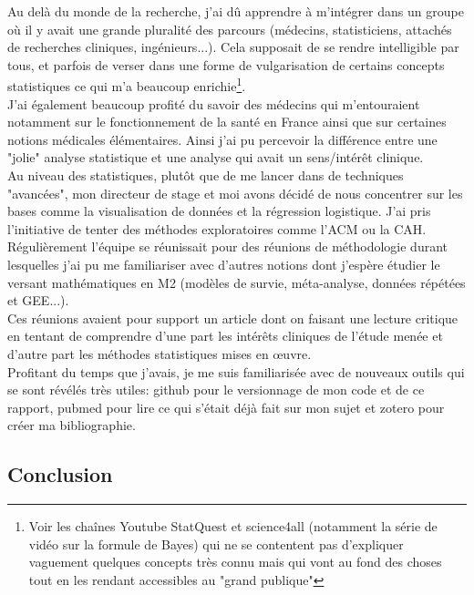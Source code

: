 \documentclass{book}
\begin{document}
\bigskip
\noindent
Au delà du monde de la recherche, j'ai dû apprendre à m'intégrer dans un groupe où il y avait une grande pluralité des parcours (médecins, statisticiens, attachés de recherches cliniques, ingénieurs...). Cela supposait de se rendre intelligible par tous, et parfois de verser dans une forme de vulgarisation de certains concepts statistiques ce qui m'a beaucoup enrichie\footnote{Voir les chaînes Youtube StatQuest et science4all (notamment la série de vidéo sur la formule de Bayes) qui ne se contentent pas d'expliquer vaguement quelques concepts très connu mais qui vont au fond des choses tout en les rendant accessibles au "grand publique"}.\\
J'ai également beaucoup profité du savoir des médecins qui m'entouraient notamment sur le fonctionnement de la santé en France ainsi que sur certaines notions médicales élémentaires. Ainsi j'ai pu percevoir la différence entre une "jolie" analyse statistique et une analyse qui avait un sens/intérêt clinique.\\ 

\bigskip
\noindent
Au niveau des statistiques, plutôt que de me lancer dans de techniques "avancées", mon directeur de stage et moi avons décidé de nous concentrer sur les bases comme la visualisation de données et la régression logistique. J'ai pris l'initiative de tenter des méthodes exploratoires comme l'ACM ou la CAH.\\
Régulièrement l'équipe se réunissait pour des réunions de méthodologie durant lesquelles j'ai pu me familiariser avec d'autres notions dont j'espère étudier le versant mathématiques en M2 (modèles de survie, méta-analyse, données répétées et GEE...).\\
Ces réunions avaient pour support un article dont on faisant une lecture critique en tentant de comprendre d'une part les intérêts cliniques de l'étude menée et d'autre part les méthodes statistiques mises en œuvre.\\

\bigskip
\noindent
Profitant du temps que j'avais, je me suis familiarisée avec de nouveaux outils qui se sont révélés très utiles: github pour le versionnage de mon code et de ce rapport, pubmed pour lire ce qui s'était déjà fait sur mon sujet et zotero pour créer ma bibliographie.

\newpage

\begin{center}
\section*{Conclusion}
\end{center}
\end{document}
